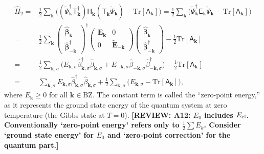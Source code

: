 \documentclass[aps, prx, nofootinbib, superscriptaddress]{revtex4-2}
\newcommand{\REVIEW}[1]{{\color{reviewcolor}\bfseries [REVIEW: #1]}}
\newcommand{\Tr}{\mathrm{Tr}}
\begin{document}
\begin{align}
    \hat{H}_{2}
    = & \frac{1}{2} \sum_{\mathbf{k}} 
    \Big( (\widetilde{\Psi}^{\dagger}_{\mathbf{k}} \mathsf{T}_{\mathbf{k}}^{\dagger}) \mathsf{H}_{\mathbf{k}}^{\phantom \dagger} (\mathsf{T}_{\mathbf{k}}^{\phantom \dagger} \widetilde{\Psi}_{\mathbf{k}}^{\phantom \dagger} )- \Tr [\mathsf{A}_{\mathbf{k}}] \Big) 
    = \frac{1}{2} \sum_{\mathbf{k}} 
    \Big( \widetilde{\Psi}^{\dagger}_{\mathbf{k}} \mathsf{E}_{\mathbf{k}} \widetilde{\Psi}_{\mathbf{k}} - \Tr [\mathsf{A}_{\mathbf{k}}] \Big) \nonumber \\
    = & \frac{1}{2} \sum_{\mathbf{k}} 
    \begin{pmatrix}
        \hat{\bm \beta}_{\mathbf{k}} \\
        \hat{\bm \beta}_{-\mathbf{k}}^{\dagger}
    \end{pmatrix}^{\dagger}
    \begin{pmatrix}
        \mathbf{E}_{\mathbf{k}} & 0 \\ 0 & \widetilde{\mathbf{E}}_{-\mathbf{k}}
    \end{pmatrix}
    \begin{pmatrix}
        \hat{\bm \beta}_{\mathbf{k}} \\
        \hat{\bm \beta}_{-\mathbf{k}}^{\dagger}
    \end{pmatrix} 
    - \frac{1}{2} \Tr [\mathsf{A}_{\mathbf{k}}]
    \nonumber \\
    = & \frac{1}{2} \sum_{\mathbf{k}, \sigma} 
    \big( 
        E_{\mathbf{k}, \sigma} \hat{\beta}^{\dagger}_{\mathbf{k}, \sigma}   \hat{\beta}^{\phantom \dagger}_{\mathbf{k}, \sigma} +
        E_{-\mathbf{k}, \sigma} \hat{\beta}^{\phantom \dagger}_{-\mathbf{k}, \sigma} \hat{\beta}^{\dagger}_{-\mathbf{k}, \sigma}
    \big) 
    - \frac{1}{2} \Tr [\mathsf{A}_{\mathbf{k}}] \\
    = & \sum_{\mathbf{k}, \sigma} E_{\mathbf{k}, \sigma} \hat{\beta}_{\mathbf{k}, \sigma}^{\dagger} \hat{\beta}_{\mathbf{k}, \sigma}^{\phantom \dagger} 
    + \frac{1}{2} \sum_{\mathbf{k}, \sigma} \big( E_{\mathbf{k}, \sigma} - \Tr [\mathsf{A}_{\mathbf{k}}] \big),
\end{align}
where $E_{\mathbf{k}} \ge 0$ for all $\mathbf{k} \in \mathrm{BZ}$. 
The constant term is called the ``zero-point energy,'' as it represents the ground state energy of the quantum system at zero temperature (the Gibbs state at $T=0$).
\REVIEW{A12: $E_0$ includes $E_{\rm cl}$. Conventionally `zero-point energy' refers only to $\frac{1}{2}\sum E_k$. Consider `ground state energy' for $E_0$ and `zero-point correction' for the quantum part.}
\end{document}
